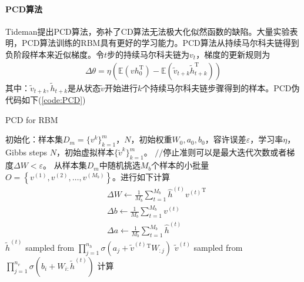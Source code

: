 {            \paragraph{PCD算法} Tideman提出PCD算法，弥补了CD算法无法极大化似然函数的缺陷。大量实验表明，PCD算法训练的RBM具有更好的学习能力。PCD算法从持续马尔科夫链得到负阶段样本来近似梯度。令$t$步的持续马尔科夫链为$v_t$，梯度的更新规则为
            \begin{align*}
            \Delta \theta = \eta \left( \mathbb{E}(vh_0^\mathrm{T}) - \mathbb{E}(\tilde{v}_{t+k} \tilde{ h}_{t+k}^\mathrm{T}) \right)
            \end{align*}
            其中：$\tilde{v}_{t+k},\tilde{h}_{t+k}$是从状态$\tilde{v}$开始进行$k$个持续马尔科夫链步骤得到的样本。PCD伪代码如下(\ref{code:PCD})
            \begin{algorithm}[htbp]
                \caption{PCD for RBM}\label{code:PCD}
                \begin{algorithmic}[1]
                    \State 初始化：样本集$D_m = \{v^k\}_{k=1}^m$，$N$，初始权重$W_0,a_0,b_0$，容许误差$\varepsilon$，学习率$\eta$，Gibbs steps $N$，初始虚拟样本$\{\tilde{v}^k\}_{k=1}^m$。
                        \State $//$停止准则可以是最大迭代次数或者梯度$\Delta W < \varepsilon$。
                        \State 从样本集$D_m$中随机挑选$M_b$个样本的小批量$O = \left\{v^{(1)},v^{(2)},\dots,v^{(M_b)}\right\}$。进行如下计算
                        \begin{align*}
                        & \Delta W \leftarrow \frac{1}{M_b}\sum_{t=1}^{M_b}\hat{h}^{(t)}{v^{(t)}}^\mathrm{T}\\
                        & \Delta b \leftarrow \frac{1}{M_b}\sum_{t=1}^{M_b}v^{(t)}\\
                        & \Delta a \leftarrow \frac{1}{M_b}\sum_{t=1}^{M_b}\hat{h}^{(t)}
                        \end{align*}
                                \State $\tilde{h}^{(t)}$ sampled from
                                $\prod_{j=1}^{n_h}\sigma \left( a_j+\tilde{v}^{(t)}{}^\mathrm{T} W_{:j} \right) $
                                \State $\tilde{v}^{(t)}$ sampled from
                                $\prod_{j=1}^{n_v}\sigma \left( b_i+W_{i:}\tilde{h}^{(t)} \right) $
                            \EndFor
                        \EndFor
                        \State 计算
                        \begin{align*}

\end{align*}
\end{algorithmic}
\end{algorithm}}
